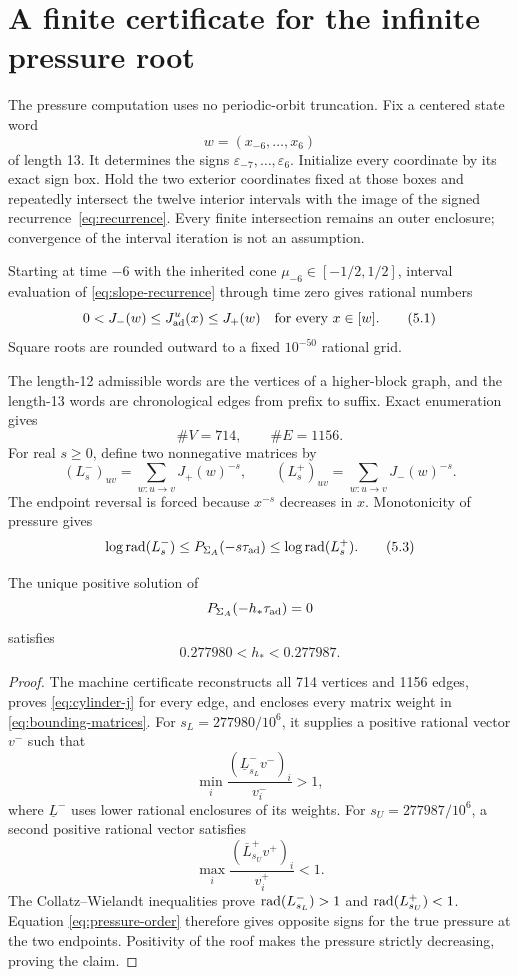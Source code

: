 \section{A finite certificate for the infinite pressure root}
\label{sec:certificate}

The pressure computation uses no periodic-orbit truncation.  Fix a centered
state word
\[
 w=(x_{-6},\ldots,x_6)
\]
of length 13.  It determines the signs
\(\varepsilon_{-7},\ldots,\varepsilon_6\).  Initialize every coordinate by
its exact sign box.  Hold the two exterior coordinates fixed at those boxes
and repeatedly intersect the twelve interior intervals with the image of
the signed recurrence~\eqref{eq:recurrence}.  Every finite intersection remains an
outer enclosure; convergence of the interval iteration is not an assumption.

Starting at time \(-6\) with the inherited cone
\(\mu_{-6}\in[-1/2,1/2]\), interval evaluation of
\eqref{eq:slope-recurrence} through time
zero gives rational numbers
\[
 0<J_-(w)\le J^u_{\mathrm{ad}}(x)\le J_+(w)
 \quad\text{for every }x\in[w].
 \tag{5.1}\label{eq:cylinder-j}
\]
Square roots are rounded outward to a fixed \(10^{-50}\) rational grid.

The length-12 admissible words are the vertices of a higher-block graph, and
the length-13 words are chronological edges from prefix to suffix.  Exact
enumeration gives
\[
 \#V=714,\qquad \#E=1156.
\]
For real \(s\ge0\), define two nonnegative matrices by
\[
 (L_s^-)_{uv}
 =\sum_{w:u\to v}J_+(w)^{-s},
 \qquad
 (L_s^+)_{uv}
 =\sum_{w:u\to v}J_-(w)^{-s}.
 \tag{5.2}\label{eq:bounding-matrices}
\]
The endpoint reversal is forced because \(x^{-s}\) decreases in \(x\).
Monotonicity of pressure gives
\[
 \log\operatorname{rad}(L_s^-)
 \le P_{\Sigma_A}(-s\tau_{\mathrm{ad}})
 \le \log\operatorname{rad}(L_s^+).
 \tag{5.3}\label{eq:pressure-order}
\]

\begin{theorem}
\label{thm:bracket}
The unique positive solution of
\[
 P_{\Sigma_A}(-h_*\tau_{\mathrm{ad}})=0
\]
satisfies
\[
 \boxed{0.277980<h_*<0.277987.}
 \tag{5.4}\label{eq:root-bracket}
\]
\end{theorem}

\begin{proof}
The machine certificate reconstructs all 714 vertices and 1156 edges, proves
\eqref{eq:cylinder-j} for every edge, and encloses every matrix weight in
\eqref{eq:bounding-matrices}.
For \(s_L=277980/10^6\), it supplies a positive rational vector \(v^-\)
such that
\[
 \min_i\frac{(\underline L_{s_L}^-v^-)_i}{v_i^-}>1,
 \tag{5.5}\label{eq:collatz-lower}
\]
where \(\underline L^-\) uses lower rational enclosures of its weights.  For
\(s_U=277987/10^6\), a second positive rational vector satisfies
\[
 \max_i\frac{(\overline L_{s_U}^+v^+)_i}{v_i^+}<1.
 \tag{5.6}\label{eq:collatz-upper}
\]
The Collatz--Wielandt inequalities prove
\(\operatorname{rad}(L_{s_L}^-)>1\) and \(\operatorname{rad}(L_{s_U}^+)<1\).  Equation
\eqref{eq:pressure-order}
therefore gives opposite signs for the true pressure at the two endpoints.
Positivity of the roof makes the pressure strictly decreasing, proving the
claim.
\end{proof}

